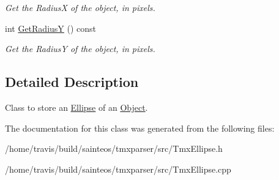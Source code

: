 \begin{DoxyCompactItemize}
\begin{DoxyCompactList}\small\item\em Get the Radius\-X of the object, in pixels. \end{DoxyCompactList}\item 
\hypertarget{classTmx_1_1Ellipse_ac00de47b8ef54f6ef5116c935ebac025}{int \hyperlink{classTmx_1_1Ellipse_ac00de47b8ef54f6ef5116c935ebac025}{Get\-Radius\-Y} () const }\label{classTmx_1_1Ellipse_ac00de47b8ef54f6ef5116c935ebac025}

\begin{DoxyCompactList}\small\item\em Get the Radius\-Y of the object, in pixels. \end{DoxyCompactList}\end{DoxyCompactItemize}


\subsection{Detailed Description}
Class to store an \hyperlink{classTmx_1_1Ellipse}{Ellipse} of an \hyperlink{classTmx_1_1Object}{Object}. 

The documentation for this class was generated from the following files\-:\begin{DoxyCompactItemize}
\item 
/home/travis/build/sainteos/tmxparser/src/Tmx\-Ellipse.\-h\item 
/home/travis/build/sainteos/tmxparser/src/Tmx\-Ellipse.\-cpp\end{DoxyCompactItemize}
